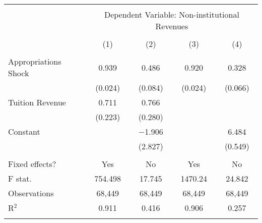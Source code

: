
\begin{tabular}{@{\extracolsep{5pt}}lcccc} 
\\[-1.8ex]\hline 
\hline \\[-1.8ex] 
 & \multicolumn{4}{c}{Dependent Variable: Non-institutional Revenues} \\ 
\cline{2-5} 
\\[-1.8ex] & (1) & (2) & (3) & (4)\\ 
\hline \\[-1.8ex] 
 Appropriations Shock & 0.939 & 0.486 & 0.920 & 0.328 \\ 
  & (0.024) & (0.084) & (0.024) & (0.066) \\ 
  Tuition Revenue & 0.711 & 0.766 &  &  \\ 
  & (0.223) & (0.280) &  &  \\ 
  Constant &  & $-$1.906 &  & 6.484 \\ 
  &  & (2.827) &  & (0.549) \\ 
 \hline \\[-1.8ex] 
Fixed effects? & Yes & No & Yes & No \\ 
F stat. & 754.498 & 17.745 & 1470.24 & 24.842 \\ 
Observations & 68,449 & 68,449 & 68,449 & 68,449 \\ 
R$^{2}$ & 0.911 & 0.416 & 0.906 & 0.257 \\ 
\hline 
\hline \\[-1.8ex] 
\end{tabular} 
